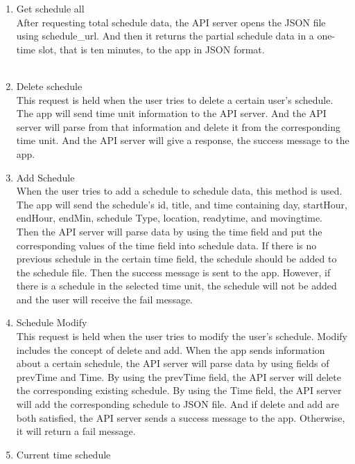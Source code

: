 \documentclass[conference]{IEEEtran}
\begin{document}
\begin{enumerate}[label=\arabic*.]
\begin{enumerate}[label=\arabic*.]
\begin{enumerate}[label=\alph*.]
\begin{enumerate}[label=\roman*.]
            \item {\large{Get schedule all }} \\
            After requesting total schedule data, the API server opens the JSON file using schedule\_url. And then it returns the partial schedule data in a one-time slot, that is ten minutes, to the app in JSON format. \\\\
            \item {\large{Delete schedule }} \\
            This request is held when the user tries to delete a certain user’s schedule. The app will send time unit information to the API server. And the API server will parse from that information and delete it from the corresponding time unit. And the API server will give a response, the success message to the app. \\
            \item {\large{Add Schedule }} \\
            When the user tries to add a schedule to schedule data, this method is used. The app will send the schedule’s id, title, and time containing day, startHour, endHour, endMin, schedule Type, location, readytime, and movingtime. \\
            Then the API server will parse data by using the time field and put the corresponding values of the time field into schedule data. If there is no previous schedule in the certain time field, the schedule should be added to the schedule file. Then the success message is sent to the app. However, if there is a schedule in the selected time unit, the schedule will not be added and the user will receive the fail message. \\
            \item {\large{Schedule Modify }} \\
            This request is held when the user tries to modify the user’s schedule. Modify includes the concept of delete and add. When the app sends information about a certain schedule, the API server will parse data by using fields of prevTime and Time. By using the prevTime field, the API server will delete the corresponding existing schedule. By using the Time field, the API server will add the corresponding schedule to JSON file. And if delete and add are both satisfied, the API server sends a success message to the app. Otherwise, it will return a fail message. \\
            \item {\large{Current time schedule }} \\

\end{enumerate}
\end{enumerate}
\end{enumerate}
\end{enumerate}
\end{document}
